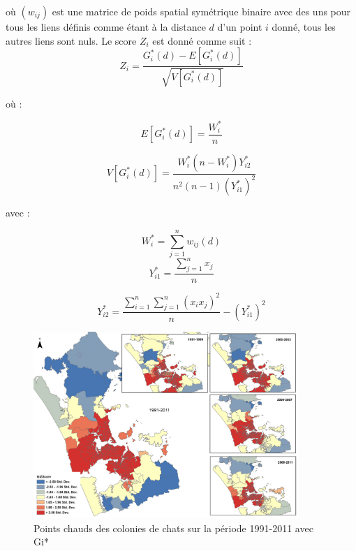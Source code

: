 \medskip
où $(w_{ij})$ est une matrice de poids spatial symétrique binaire avec des uns pour tous les liens définis comme étant à la distance $d$ d'un point $i$ donné, tous les autres liens sont nuls.
\medskip
Le score $Z_i$ est donné comme suit :
\medskip
\begin{equation}
    Z_i = \frac{G_i^*(d) - E [G_i^*(d)]}{\sqrt{V[G_i^*(d)]}}
\end{equation}

\medskip

où :

\medskip

\begin{equation}
    E[G_i^*(d)] = \frac{W_i^*}{n}
\end{equation}

\begin{equation}
    V[G_i^*(d)] = \frac{W_i^*(n - W_i^*)Y_{i2}^*}{n^2(n - 1) (Y_{i1}^*)^2}
\end{equation}

\medskip
avec :

\medskip
\begin{equation}
    W_i^* = \sum_{j=1}^n w_{ij}(d)
\end{equation}
\begin{equation}
    Y_{i1}^* = \frac{\sum_{j=1}^n x_j}{n}
\end{equation}

\begin{equation}
    Y_{i2}^* = \frac{\sum_{i=1}^n \sum_{j=1}^n (x_i x_j)^2}{n} - (Y_{i1}^*)^2
\end{equation}

\medskip

\begin{figure}[hbt!]
  \centering
  \includegraphics[width=10cm]{images_pfe/GI_result.png}
  \caption{Points chauds des colonies de chats sur la période 1991-2011 avec Gi* \parencite{aguilar_distribution_2013}}
  \label{fig:gi-result}
\end{figure}
\FloatBarrier

